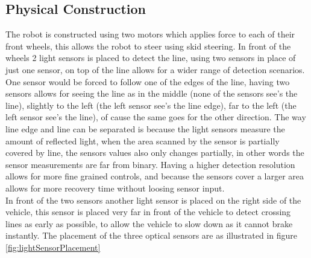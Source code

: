 \documentclass[draft, english, a4paper]{article}
\begin{document}
	\subsection{Physical Construction} %
	    \label{robot:physicalContruction}
	    The robot is constructed using two motors which applies force to
	    each of their front wheels, this allows the robot to steer using skid steering.
	    In front of the wheels 2 light sensors is placed to detect the line, using
	    two sensors in place of just one sensor, on top of the line allows for a wider
	    range of detection scenarios. One sensor would be forced to follow one
	    of the edges of the line, having two sensors allows for seeing the line
	    as in the middle (none of the sensors see's the line), slightly to the left (the left sensor see's the
	    line edge), far to the left (the left sensor see's the line), of cause the same
	    goes for the other direction. The way line edge and line can be separated is
	    because the light sensors measure the amount of reflected light, when the area
	    scanned by the sensor is partially covered by line, the sensors values also only changes partially,
	    in other words the sensor measurements are far from binary. Having a higher detection resolution
	    allows for more fine grained controls, and because the sensors cover a larger area allows for more recovery
	    time without loosing sensor input.\\
	    In front of the two sensors another light sensor is placed on the right side of the vehicle,
	    this sensor is placed very far in front of the vehicle to detect crossing lines as early as possible, to allow
	    the vehicle to slow down as it cannot brake instantly. The placement of the three optical sensors are as illustrated in figure \ref{fig:lightSensorPlacement}
\end{document}
